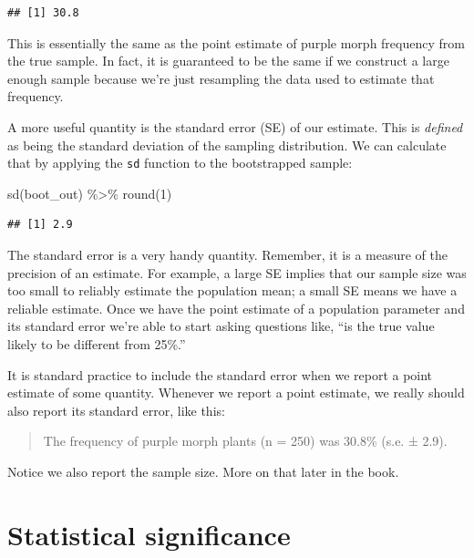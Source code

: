 \documentclass[
]{book}
\newenvironment{Shaded}{\begin{snugshade}}{\end{snugshade}}
\newcommand{\DecValTok}[1]{\textcolor[rgb]{0.00,0.00,0.81}{#1}}
\newcommand{\FunctionTok}[1]{\textcolor[rgb]{0.00,0.00,0.00}{#1}}
\newcommand{\NormalTok}[1]{#1}
\newcommand{\SpecialCharTok}[1]{\textcolor[rgb]{0.00,0.00,0.00}{#1}}
\begin{document}
\begin{verbatim}
## [1] 30.8
\end{verbatim}

This is essentially the same as the point estimate of purple morph frequency from the true sample. In fact, it is guaranteed to be the same if we construct a large enough sample because we're just resampling the data used to estimate that frequency.

A more useful quantity is the standard error (SE) of our estimate. This is \emph{defined} as being the standard deviation of the sampling distribution. We can calculate that by applying the \texttt{sd} function to the bootstrapped sample:

\begin{Shaded}
\begin{Highlighting}[]
\FunctionTok{sd}\NormalTok{(boot\_out) }\SpecialCharTok{\%\textgreater{}\%} \FunctionTok{round}\NormalTok{(}\DecValTok{1}\NormalTok{)}
\end{Highlighting}
\end{Shaded}

\begin{verbatim}
## [1] 2.9
\end{verbatim}

The standard error is a very handy quantity. Remember, it is a measure of the precision of an estimate. For example, a large SE implies that our sample size was too small to reliably estimate the population mean; a small SE means we have a reliable estimate. Once we have the point estimate of a population parameter and its standard error we're able to start asking questions like, ``is the true value likely to be different from 25\%.''

It is standard practice to include the standard error when we report a point estimate of some quantity. Whenever we report a point estimate, we really should also report its standard error, like this:

\begin{quote}
The frequency of purple morph plants (n = 250) was 30.8\% (s.e. ± 2.9).
\end{quote}

Notice we also report the sample size. More on that later in the book.

\hypertarget{statistical-significance}{%
\section{Statistical significance}\label{statistical-significance}}
\end{document}

